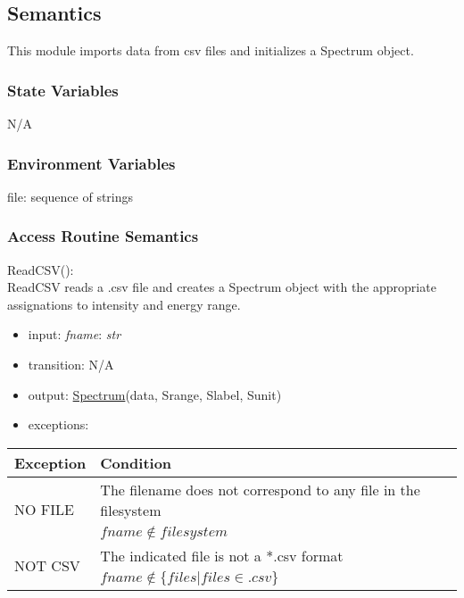 \documentclass[12pt, titlepage]{article}
\begin{document}
\subsection{Semantics}
This module imports data from csv files and initializes a Spectrum object.

\subsubsection{State Variables}
N/A

\subsubsection{Environment Variables}
file: sequence of strings 

\subsubsection{Access Routine Semantics}

\noindent ReadCSV():\\
ReadCSV reads a .csv file and creates a Spectrum object with the appropriate
assignations to intensity and energy range.
\begin{itemize}
    \item input: \textit{fname}: \textit{str}
    \item transition: N/A 
    \item output: \hyperref[Mod:Spectrum]{Spectrum}(data, Srange, Slabel, Sunit) 
    \item exceptions:
\end{itemize}
\begin{center}
    \begin{tabular}{p{3cm} p{12cm}}
        \toprule[0.15em]
        \textbf{Exception} & \textbf{Condition}\\
        \midrule[0.1em]
        \multirow{2}{0.25\textwidth}{NO FILE} & The filename does not correspond to
        any file in the filesystem\\ 
        & $fname \notin filesystem$\\ 
        \midrule[0.05em]
        \multirow{2}{0.25\textwidth}{NOT CSV} & The indicated file is not a *.csv
        format\\
        & $fname \notin \{files|files \in .csv\}$\\ 
        \bottomrule[0.15em]
    \end{tabular}
\end{center}
\end{document}
